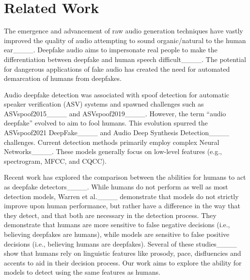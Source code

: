 \section{Related Work}
\label{sec:relwork} 
 
The emergence and advancement of raw audio generation techniques have vastly improved the quality of audio attempting to sound organic/natural to the human ear____.  Deepfake audio aims to impersonate real people to make the differentiation between deepfake and human speech
difficult____.  The potential for dangerous applications of fake audio has created the need for automated demarcation of humans from deepfakes. 

Audio deepfake detection was associated with spoof detection for automatic speaker verification (ASV) systems and spawned challenges such as ASVspoof2015____ and ASVspoof2019____.  However, the term ``audio
deepfake'' evolved to aim to fool humans.  This evolution spurred the
ASVspoof2021 DeepFake____ and Audio Deep Synthesis Detection____  challenges. Current detection methods primarily employ complex Neural Networks____.  These models generally focus on low-level features (e.g., spectrogram, MFCC, and CQCC). 


Recent work has explored the comparison between the abilities for humans to act as deepfake detectors____. While humans do not perform as well as most detection models, Warren et al.____ demonstrate that models do not strictly improve upon human performance, but rather have a difference in the way that they detect, and that both are necessary in the detection process. They demonstrate that humans are more sensitive to false negative decisions (i.e., believing deepfakes are humans), while models are sensitive to false positive decisions (i.e., believing humans are deepfakes). Several of these studies____ show that humans rely on linguistic features like prosody, pace, disfluencies and accents to aid in their decision process. Our work aims to explore the ability for models to detect using the same features as humans.